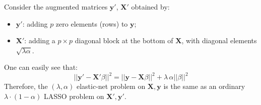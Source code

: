 

Consider the augmented matrices $\mathbf{y}'$, $\mathbf{X}'$ obtained by:
\begin{itemize}
    \item $\mathbf{y}'$: adding $p$ zero elements (rows) to $\mathbf{y}$;
    \item $\mathbf{X}'$: adding a $p \times p$ diagonal block at the bottom
    of $\mathbf{X}$, with diagonal elements $\sqrt{\lambda \alpha}$.
\end{itemize}
One can easily see that:
\begin{equation*}
|| \mathbf{y}' - \mathbf{X}' \beta||^2 = 
    || \mathbf{y} - \mathbf{X} \beta||^2 + \lambda\,\alpha ||\beta||^2
\end{equation*}
Therefore, the $(\lambda, \alpha)$ elastic-net problem on $\mathbf{X}, \mathbf{y}$
is the same as an ordinary $\lambda \cdot (1 - \alpha)$ LASSO problem
on $\mathbf{X}', \mathbf{y}'$.